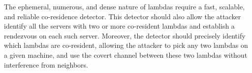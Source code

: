 The ephemeral, numerous, and dense nature of lambdas require a fast, scalable,
and reliable co-residence detector. This detector should also allow the attacker
identify all the servers with two or more co-resident lambdas and establish a
rendezvous on each such server. Moreover, the detector should precisely identify which lambdas are
co-resident, allowing the attacker to pick any two lambdas on a given machine,
and use the covert channel between these two lambdas without interference from
neighbors. 


